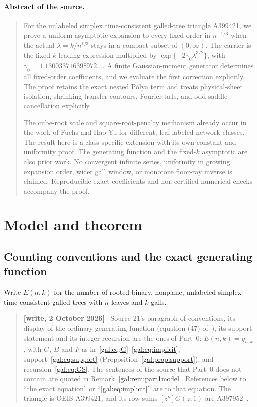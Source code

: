\documentclass[11pt,letterpaper]{article}
\numberwithin{equation}{section}
\theoremstyle{definition}\newtheorem{definition}[theorem]{Definition}
\theoremstyle{remark}\newtheorem{remark}[theorem]{Remark}
\newenvironment{writenote}{\par\smallskip\begin{quote}\small\textbf{[write, 2 October 2026]}\ }{\end{quote}\smallskip}
\begin{document}
\paragraph{Abstract of the source.}
\begin{quote}\small
For the unlabeled simplex time-consistent galled-tree triangle A399421, we prove a uniform asymptotic expansion to every fixed order in $n^{-1/3}$ when the actual $\lambda=k/n^{1/3}$ stays in a compact subset of $(0,\infty)$. The carrier is the fixed-$k$ leading expression multiplied by $\exp\{-2\gamma_0\lambda^{3/2}\}$, with $\gamma_0=1.130033716398972\ldots$. A finite Gaussian-moment generator determines all fixed-order coefficients, and we evaluate the first correction explicitly.
The proof retains the exact nested P\'olya term and treats physical-sheet isolation, shrinking transfer contours, Fourier tails, and odd saddle cancellation explicitly.

The cube-root scale and square-root-penalty mechanism already occur in the work of Fuchs and Hao Yu for different, leaf-labeled network classes. The result here is a class-specific extension with its own constant and uniformity proof. The generating function and the fixed-$k$ asymptotic are also prior work. No convergent infinite series, uniformity in growing expansion order, wider gall window, or monotone floor-ray inverse is claimed. Reproducible exact coefficients and non-certified numerical checks accompany the proof.
\end{quote}

\section{Model and theorem}
\subsection{Counting conventions and the exact generating function}
Write $E(n,k)$ for the number of rooted binary, nonplane, unlabeled simplex time-consistent galled trees with $n$ leaves and $k$ galls.
\begin{writenote}
Source 21's paragraph of conventions, its display of the ordinary generating function (equation (47) of~\cite{comparison}), its support statement and its integer recursion are the ones of Part~0: $E(n,k)=g_{n,k}$, with $G$, $B$ and $F$ as in~\eqref{gal:eq:G}--\eqref{gal:eq:implicit}, support~\eqref{gal:eq:support} (Proposition~\ref{gal:prop:support}), and recursion~\eqref{gal:eq:GS}. The sentences of the source that Part~0 does not contain are quoted in Remark~\ref{gal:rem:part1model}. References below to ``the exact equation'' or ``\eqref{gal:eq:implicit}'' are to that equation. The triangle is OEIS A399421, and its row sums $[z^n]G(z,1)$ are A397952~\cite{oeis399421,oeis397952}.
\end{writenote}
\end{document}
